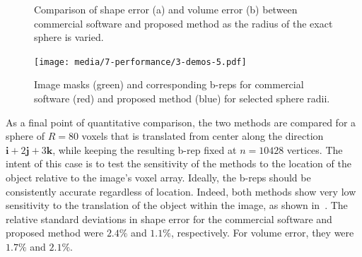 \begin{figure}[b!]
	\centering
	\caption{Comparison of shape error (a) and volume error (b) between commercial software and proposed method as the radius of the exact sphere is varied.}
	\label{fig:graph2}
\end{figure}
\begin{figure}[ht!]
	\centering
	\texttt{[image: media/7-performance/3-demos-5.pdf]}
	\caption{Image masks (green) and corresponding b-reps for commercial software (red) and proposed method (blue) for selected sphere radii.}
	\label{fig:demos2}
\end{figure}
{\noindent}As a final point of quantitative comparison, the two methods are compared for a sphere of $R = 80$ voxels that is translated from center along the direction $\bm{i}  + 2\bm{j} + 3\bm{k}$, while keeping the resulting b-rep fixed at $n = 10428$ vertices. The intent of this case is to test the sensitivity of the methods to the location of the object relative to the image's voxel array. Ideally, the b-reps should be consistently accurate regardless of location.  Indeed, both methods show very low sensitivity to the translation of the object within the image, as shown in~. The relative standard deviations in shape error for the commercial software and proposed method were $2.4\%$ and $1.1\%$, respectively. For volume error, they were $1.7\%$ and $2.1\%$. \\

